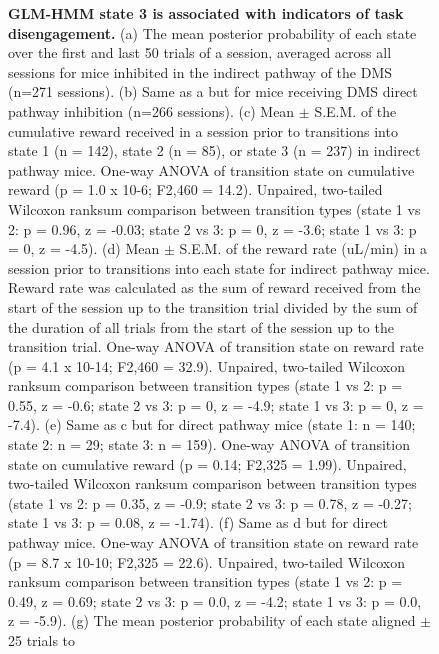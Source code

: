 \begin{figure}[t!]
\begin{center}
    \caption[GLM-HMM state 3 is associated with indicators of task disengagement]{\textbf{GLM-HMM state 3 is associated with indicators of task disengagement.} (a) The mean posterior probability of each state over the first and last 50 trials of a session, averaged across all sessions for mice inhibited in the indirect pathway of the DMS (n=271 sessions). (b) Same as a but for mice receiving DMS direct pathway inhibition (n=266 sessions). (c) Mean $\pm$ S.E.M. of the cumulative reward received in a session prior to transitions into state 1 (n = 142), state 2 (n = 85), or state 3 (n = 237) in indirect pathway mice. One-way ANOVA of transition state on cumulative reward (p = 1.0 x 10-6; F2,460 = 14.2). Unpaired, two-tailed Wilcoxon ranksum comparison between transition types (state 1 vs 2: p = 0.96, z = -0.03; state 2 vs 3: p = 0, z = -3.6; state 1 vs 3: p = 0, z = -4.5). (d) Mean $\pm$ S.E.M. of the reward rate (uL/min) in a session prior to transitions into each state for indirect pathway mice. Reward rate was calculated as the sum of reward received from the start of the session up to the transition trial divided by the sum of the duration of all trials from the start of the session up to the transition trial. One-way ANOVA of transition state on reward rate (p = 4.1 x 10-14; F2,460 = 32.9). Unpaired, two-tailed Wilcoxon ranksum comparison between transition types (state 1 vs 2: p = 0.55, z = -0.6; state 2 vs 3: p = 0, z = -4.9; state 1 vs 3: p = 0, z = -7.4). (e) Same as c but for direct pathway mice (state 1: n = 140; state 2: n = 29; state 3: n = 159). One-way ANOVA of transition state on cumulative reward (p = 0.14; F2,325 = 1.99). Unpaired, two-tailed Wilcoxon ranksum comparison between transition types (state 1 vs 2: p = 0.35, z = -0.9; state 2 vs 3: p = 0.78, z = -0.27; state 1 vs 3: p = 0.08, z = -1.74). (f) Same as d but for direct pathway mice. One-way ANOVA of transition state on reward rate (p = 8.7 x 10-10; F2,325 = 22.6). Unpaired, two-tailed Wilcoxon ranksum comparison between transition types (state 1 vs 2: p = 0.49, z = 0.69; state 2 vs 3: p = 0.0, z = -4.2; state 1 vs 3: p = 0.0, z = -5.9). (g) The mean posterior probability of each state aligned $\pm$ 25 trials to}
    \label{fig:ap1:ext8}
  \end{center}
\end{figure}
\begin{figure}[t!]
\end{figure}

